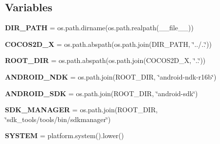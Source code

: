 \subsection*{Variables}
\begin{DoxyCompactItemize}
\item 
\mbox{\label{namespacesetup__android_ad599453e118b2fedc33a59ff29ac491c}} 
{\bfseries D\+I\+R\+\_\+\+P\+A\+TH} = os.\+path.\+dirname(os.\+path.\+realpath(\+\_\+\+\_\+file\+\_\+\+\_\+))
\item 
\mbox{\label{namespacesetup__android_add15dbf84ab7fb159a4e4a314dc3b5ab}} 
{\bfseries C\+O\+C\+O\+S2\+D\+\_\+X} = os.\+path.\+abspath(os.\+path.\+join(D\+I\+R\+\_\+\+P\+A\+TH, \char`\"{}../..\char`\"{}))
\item 
\mbox{\label{namespacesetup__android_a6278d3bf2b7b03b4b1d337f6161760f7}} 
{\bfseries R\+O\+O\+T\+\_\+\+D\+IR} = os.\+path.\+abspath(os.\+path.\+join(C\+O\+C\+O\+S2\+D\+\_\+X, \char`\"{}..\char`\"{}))
\item 
\mbox{\label{namespacesetup__android_a9bb05ce1257f3a00e58ba6f9180c4820}} 
{\bfseries A\+N\+D\+R\+O\+I\+D\+\_\+\+N\+DK} = os.\+path.\+join(R\+O\+O\+T\+\_\+\+D\+IR, \char`\"{}android-\/ndk-\/r16b\char`\"{})
\item 
\mbox{\label{namespacesetup__android_a9acb71d1523e57d41f9faf2792a36c3b}} 
{\bfseries A\+N\+D\+R\+O\+I\+D\+\_\+\+S\+DK} = os.\+path.\+join(R\+O\+O\+T\+\_\+\+D\+IR, \char`\"{}android-\/sdk\char`\"{})
\item 
\mbox{\label{namespacesetup__android_a7427a0bfe007edd51e4157a705a2a62b}} 
{\bfseries S\+D\+K\+\_\+\+M\+A\+N\+A\+G\+ER} = os.\+path.\+join(R\+O\+O\+T\+\_\+\+D\+IR, \char`\"{}sdk\+\_\+tools/tools/bin/sdkmanager\char`\"{})
\item 
\mbox{\label{namespacesetup__android_ac87d6121fdcb86e477e899a24cc1062d}} 
{\bfseries S\+Y\+S\+T\+EM} = platform.\+system().lower()
\item 
\mbox{\label{namespacesetup__android_a66d681bcc351da158e98897194f74bf7}} 

\end{DoxyCompactItemize}
